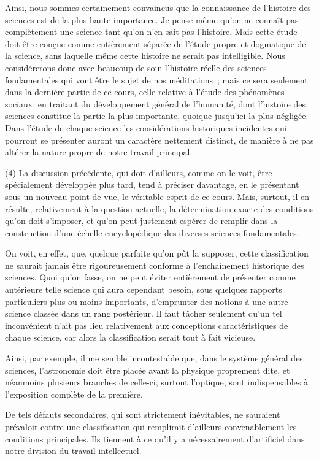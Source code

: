 \documentclass[french,twoside]{book} %
\begin{document}
Ainsi, nous sommes certainement convaincus que la connaissance de l’histoire des sciences est de la plus haute importance. Je pense même qu’on ne connaît pas complètement une science tant qu’on n’en sait pas l’histoire. Mais cette étude doit être conçue comme entièrement séparée de l’étude propre et dogmatique de la science, sans laquelle même cette histoire ne serait pas intelligible. Nous considérerons donc avec beaucoup de soin l’histoire réelle des sciences fondamentales qui vont être le sujet de nos méditations ; mais ce sera seulement dans la dernière partie de ce cours, celle relative à l’étude des phénomènes sociaux, en traitant du développement général de l’humanité, dont l’histoire des sciences constitue la partie la plus importante, quoique jusqu’ici la plus négligée. Dans l’étude de chaque science les considérations historiques incidentes qui pourront se présenter auront un caractère nettement distinct, de manière à ne pas altérer la nature propre de notre travail principal.\par
(4) La discussion précédente, qui doit d’ailleurs, comme on le voit, être spécialement développée plus tard, tend à préciser davantage, en le présentant sous un nouveau point de vue, le véritable esprit de ce cours. Mais, surtout, il en résulte, relativement à la question actuelle, la détermination exacte des conditions qu’on doit s’imposer, et qu’on peut justement espérer de remplir dans la construction d’une échelle encyclopédique des diverses sciences fondamentales.\par
On voit, en effet, que, quelque parfaite qu’on pût la supposer, cette classification ne saurait jamais être rigoureusement conforme à l’enchaînement historique des sciences. Quoi qu’on fasse, on ne peut éviter entièrement de présenter comme antérieure telle science qui aura cependant besoin, sous quelques rapports particuliers plus ou moins importants, d’emprunter des notions à une autre science classée dans un rang postérieur. Il faut tâcher seulement qu’un tel inconvénient n’ait pas lieu relativement aux conceptions caractéristiques de chaque science, car alors la classification serait tout à fait vicieuse.\par
Ainsi, par exemple, il me semble incontestable que, dans le système général des sciences, l’astronomie doit être placée avant la physique proprement dite, et néanmoins plusieurs branches de celle-ci, surtout l’optique, sont indispensables à l’exposition complète de la première.\par
De tels défauts secondaires, qui sont strictement inévitables, ne sauraient prévaloir contre une classification qui remplirait d’ailleurs convenablement les conditions principales. Ils tiennent à ce qu’il y a nécessairement d’artificiel dans notre division du travail intellectuel.\par
\end{document}

